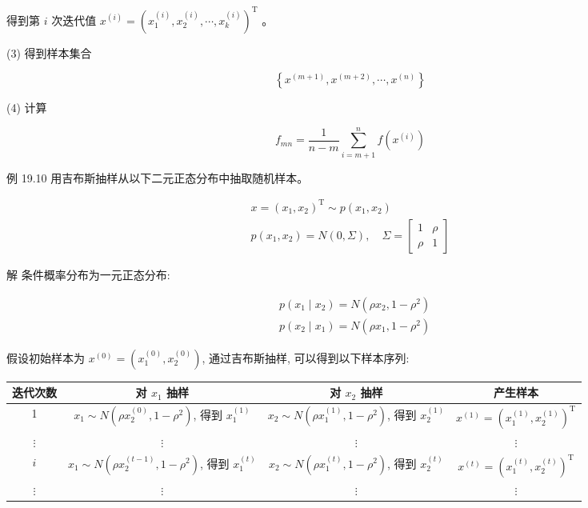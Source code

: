 \documentclass[10pt]{article}
\begin{document}
\begin{CJK*}{UTF8}{bsmi}
得到第 $i$ 次迭代值 $x^{(i)}=\left(x_{1}^{(i)}, x_{2}^{(i)}, \cdots, x_{k}^{(i)}\right)^{\mathrm{T}}$ 。

(3) 得到样本集合

$$
\left\{x^{(m+1)}, x^{(m+2)}, \cdots, x^{(n)}\right\}
$$

(4) 计算

$$
f_{m n}=\frac{1}{n-m} \sum_{i=m+1}^{n} f\left(x^{(i)}\right)
$$

例 19.10 用吉布斯抽样从以下二元正态分布中抽取随机样本。

$$
\begin{gathered}
x=\left(x_{1}, x_{2}\right)^{\mathrm{T}} \sim p\left(x_{1}, x_{2}\right) \\
p\left(x_{1}, x_{2}\right)=N(0, \Sigma), \quad \Sigma=\left[\begin{array}{ll}
1 & \rho \\
\rho & 1
\end{array}\right]
\end{gathered}
$$

解 条件概率分布为一元正态分布:

$$
\begin{aligned}
& p\left(x_{1} \mid x_{2}\right)=N\left(\rho x_{2}, 1-\rho^{2}\right) \\
& p\left(x_{2} \mid x_{1}\right)=N\left(\rho x_{1}, 1-\rho^{2}\right)
\end{aligned}
$$

假设初始样本为 $x^{(0)}=\left(x_{1}^{(0)}, x_{2}^{(0)}\right)$, 通过吉布斯抽样, 可以得到以下样本序列:

\begin{center}
\begin{tabular}{c|c|c|c}
\hline
迭代次数 & 对 $x_{1}$ 抽样 & 对 $x_{2}$ 抽样 & 产生样本 \\
\hline
1 & $x_{1} \sim N\left(\rho x_{2}^{(0)}, 1-\rho^{2}\right)$, 得到 $x_{1}^{(1)}$ & $x_{2} \sim N\left(\rho x_{1}^{(1)}, 1-\rho^{2}\right)$, 得到 $x_{2}^{(1)}$ & $x^{(1)}=\left(x_{1}^{(1)}, x_{2}^{(1)}\right)^{\mathrm{T}}$ \\
$\vdots$ & $\vdots$ & $\vdots$ & $\vdots$ \\
$i$ & $x_{1} \sim N\left(\rho x_{2}^{(t-1)}, 1-\rho^{2}\right)$, 得到 $x_{1}^{(t)}$ & $x_{2} \sim N\left(\rho x_{1}^{(t)}, 1-\rho^{2}\right)$, 得到 $x_{2}^{(t)}$ & $x^{(t)}=\left(x_{1}^{(t)}, x_{2}^{(t)}\right)^{\mathrm{T}}$ \\
$\vdots$ & $\vdots$ & $\vdots$ & $\vdots$ \\
\hline
\end{tabular}
\end{center}


\end{CJK*}
\end{document}
